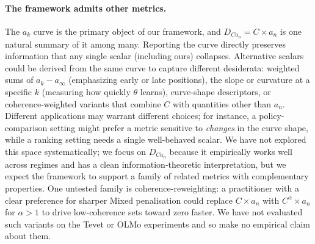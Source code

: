 \paragraph{The framework admits other metrics.} The $a_k$ curve is the primary object of our framework, and $D_{Ca_n} = C \times a_n$ is one natural summary of it among many.
Reporting the curve directly preserves information that any single scalar (including ours) collapses.
Alternative scalars could be derived from the same curve to capture different desiderata: weighted sums of $a_k - a_\infty$ (emphasizing early or late positions), the slope or curvature at a specific $k$ (measuring how quickly $\theta$ learns), curve-shape descriptors, or coherence-weighted variants that combine $C$ with quantities other than $a_n$.
Different applications may warrant different choices; for instance, a policy-comparison setting might prefer a metric sensitive to \emph{changes} in the curve shape, while a ranking setting needs a single well-behaved scalar.
We have not explored this space systematically; we focus on $D_{Ca_n}$ because it empirically works well across regimes and has a clean information-theoretic interpretation, but we expect the framework to support a family of related metrics with complementary properties.
One untested family is coherence-reweighting: a practitioner with a clear preference for sharper Mixed penalisation could replace $C \times a_n$ with $C^{\alpha} \times a_n$ for $\alpha > 1$ to drive low-coherence sets toward zero faster.
We have not evaluated such variants on the Tevet or OLMo experiments and so make no empirical claim about them.

